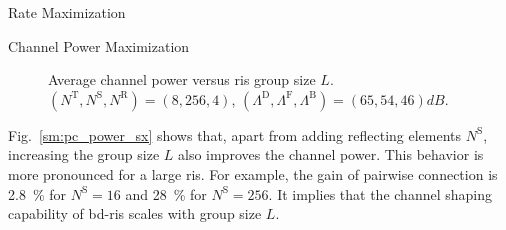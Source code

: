 \documentclass[journal]{IEEEtran}
\begin{document}
\begin{section}{Rate Maximization}
\begin{subsection}{Channel Power Maximization}
		\begin{figure}[!t]
			\centering
			\caption{Average channel power versus \gls{ris} group size $L$. $(N^\mathrm{T}, N^\mathrm{S}, N^\mathrm{R}) = (8, 256, 4)$, $(\Lambda^\mathrm{D}, \Lambda^\mathrm{F}, \Lambda^\mathrm{B}) = (65, 54, 46) \unit{dB}$.}
			\label{sm:pc_power_bond}
		\end{figure}
		Fig.~\ref{sm:pc_power_sx} shows that, apart from adding reflecting elements $N^\mathrm{S}$, increasing the group size $L$ also improves the channel power.
		This behavior is more pronounced for a large \gls{ris}.
		For example, the gain of pairwise connection is \qty{2.8}{\percent} for $N^\mathrm{S} = 16$ and \qty{28}{\percent} for $N^\mathrm{S} = 256$.
		It implies that the channel shaping capability of \gls{bd}-\gls{ris} scales with group size $L$.


\end{subsection}
\end{section}
\end{document}

